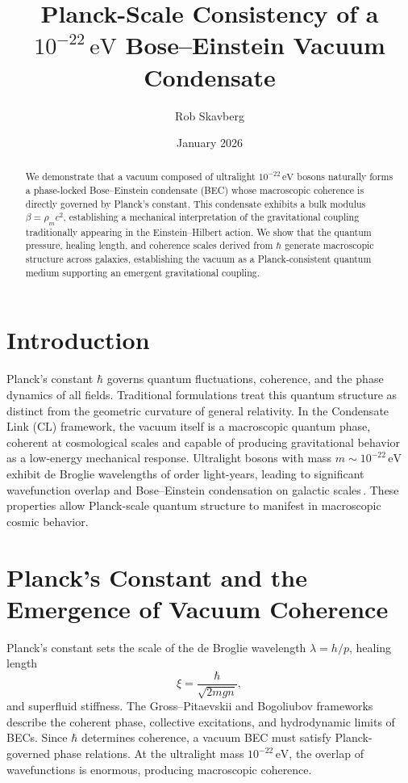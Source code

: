 \documentclass[aps,prd,twocolumn,amsmath,amssymb,longbibliography,nofootinbib]{revtex4-2}
\begin{document}
\title{Planck-Scale Consistency of a \texorpdfstring{$10^{-22}\,\mathrm{eV}$}{10^{-22} eV} Bose--Einstein Vacuum Condensate}
\author{Rob Skavberg}
\date{January 2026}

\begin{abstract}
We demonstrate that a vacuum composed of ultralight \(10^{-22}\,\mathrm{eV}\) bosons naturally forms a phase-locked Bose--Einstein condensate (BEC) whose macroscopic coherence is directly governed by Planck's constant. This condensate exhibits a bulk modulus \(\beta = \rho_{m} c^{2}\), establishing a mechanical interpretation of the gravitational coupling traditionally appearing in the Einstein--Hilbert action. We show that the quantum pressure, healing length, and coherence scales derived from \(\hbar\) generate macroscopic structure across galaxies, establishing the vacuum as a Planck-consistent quantum medium supporting an emergent gravitational coupling.
\end{abstract}

\maketitle

\section{Introduction}
Planck's constant \(\hbar\) governs quantum fluctuations, coherence, and the phase dynamics of all fields. Traditional formulations treat this quantum structure as distinct from the geometric curvature of general relativity. In the Condensate Link (CL) framework, the vacuum itself is a macroscopic quantum phase, coherent at cosmological scales and capable of producing gravitational behavior as a low-energy mechanical response. Ultralight bosons with mass \(m\sim 10^{-22}\,\mathrm{eV}\) exhibit de Broglie wavelengths of order light-years, leading to significant wavefunction overlap and Bose--Einstein condensation on galactic scales\,\cite{Hui2017ULDM,Marsh2016axion}. These properties allow Planck-scale quantum structure to manifest in macroscopic cosmic behavior.

\section{Planck's Constant and the Emergence of Vacuum Coherence}
Planck's constant sets the scale of the de Broglie wavelength \(\lambda = h/p\), healing length
\begin{equation}
  \xi = \frac{\hbar}{\sqrt{2 m g n}},
\end{equation}
and superfluid stiffness. The Gross--Pitaevskii and Bogoliubov frameworks\,\cite{Gross1961,Pitaevskii1961,Bogoliubov1947,Dalfovo1999,PethickSmith2002} describe the coherent phase, collective excitations, and hydrodynamic limits of BECs. Since \(\hbar\) determines coherence, a vacuum BEC must satisfy Planck-governed phase relations. At the ultralight mass \(10^{-22}\,\mathrm{eV}\), the overlap of wavefunctions is enormous, producing macroscopic coherence.
\end{document}
